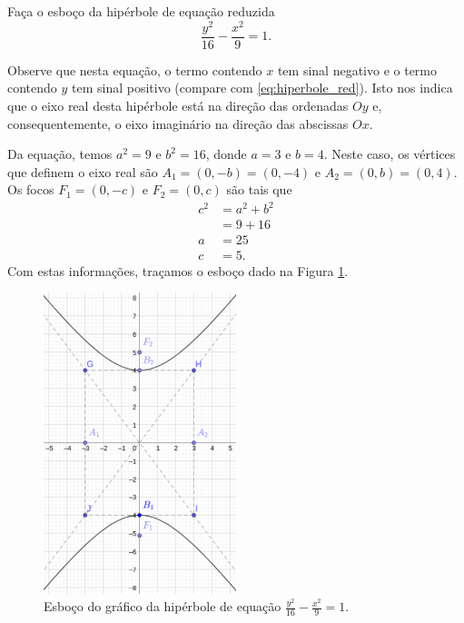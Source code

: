 \begin{exeresol}
  Faça o esboço da hipérbole de equação reduzida
  \begin{equation}
    \frac{y^2}{16} - \frac{x^2}{9} = 1.
  \end{equation}
\end{exeresol}
\begin{resol}
  Observe que nesta equação, o termo contendo $x$ tem sinal negativo e o termo contendo $y$ tem sinal positivo (compare com \eqref{eq:hiperbole_red}). Isto nos indica que o eixo real desta hipérbole está na direção das ordenadas $Oy$ e, consequentemente, o eixo imaginário na direção das abscissas $Ox$.

  Da equação, temos $a^2 = 9$ e $b^2=16$, donde $a=3$ e $b=4$. Neste caso, os vértices que definem o eixo real são $A_1=(0, -b)=(0, -4)$ e $A_2=(0, b)=(0, 4)$. Os focos $F_1=(0, -c)$ e $F_2=(0, c)$ são tais que
  \begin{align}
    c^2 &= a^2 + b^2 \\
        &= 9 + 16 \\a
        &= 25 \\
    c &= 5.
  \end{align}
  Com estas informações, traçamos o esboço dado na Figura \ref{fig:hiperbole_exeresol_oy}.

  \begin{figure}[H]
    \centering
    \includegraphics[width=0.5\textwidth]{cap_conicas/dados/fig_hiperbole_exeresol_oy/fig}
    \caption{Esboço do gráfico da hipérbole de equação $\displaystyle\frac{y^2}{16}-\frac{x^2}{9}=1$.}
    \label{fig:hiperbole_exeresol_oy}
  \end{figure}   
\end{resol}


